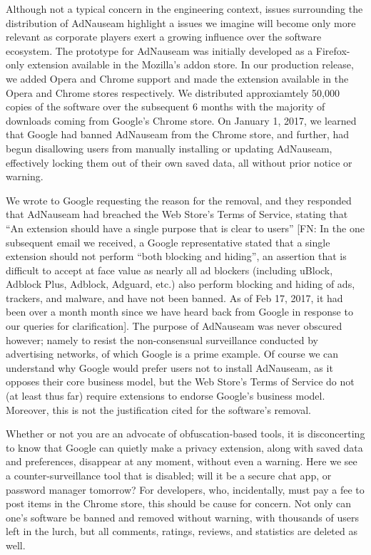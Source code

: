 \documentclass[conference]{IEEEtran}
\begin{document}
Although not a typical concern in the engineering context, issues surrounding the distribution of AdNauseam highlight a issues we imagine will become only more relevant as corporate players exert a growing influence over the software ecosystem. The prototype for AdNauseam was initially developed as a Firefox-only extension available in the Mozilla's addon store. In our production release, we added Opera and Chrome support and made the extension available in the Opera and Chrome stores respectively. We distributed approxiamtely 50,000 copies of the software over the subsequent 6 months with the majority of downloads coming from Google's Chrome store. On January 1, 2017,  we learned that Google had banned AdNauseam from the Chrome store, and further, had begun disallowing users from manually installing or updating AdNauseam, effectively locking them out of their own saved data, all without prior notice or warning.

We wrote to Google requesting the reason for the removal, and they responded that AdNauseam had breached the Web Store’s Terms of Service, stating that ``An extension should have a single purpose that is clear to users'' [FN: In the one subsequent email we received, a Google representative stated that a single extension should not perform ``both blocking and hiding'', an assertion that is difficult to accept at face value as nearly all ad blockers (including uBlock, Adblock Plus, Adblock, Adguard, etc.) also perform blocking and hiding of ads, trackers, and malware, and have not been banned. As of Feb 17, 2017, it had been over a month month since we have heard back from Google in response to our queries for clarification]. The purpose of AdNauseam was never obscured however; namely to resist the non-consensual surveillance conducted by advertising networks, of which Google is a prime example. Of course we can  understand why Google would prefer users not to install AdNauseam, as it opposes their core business model, but the Web Store’s Terms of Service do not (at least thus far) require extensions to endorse Google’s business model. Moreover, this is not the justification cited for the software’s removal.

Whether or not you are an advocate of obfuscation-based tools, it is disconcerting to know that Google can quietly make a privacy extension, along with saved data and preferences, disappear at any moment, without even a warning. Here we see a counter-surveillance tool that is disabled; will it be a secure chat app, or password manager tomorrow? For developers, who, incidentally, must pay a fee to post items in the Chrome store, this should be cause for concern. Not only can one's software be banned and removed without warning, with thousands of users left in the lurch, but all comments, ratings, reviews, and statistics are deleted as well.
\end{document}
